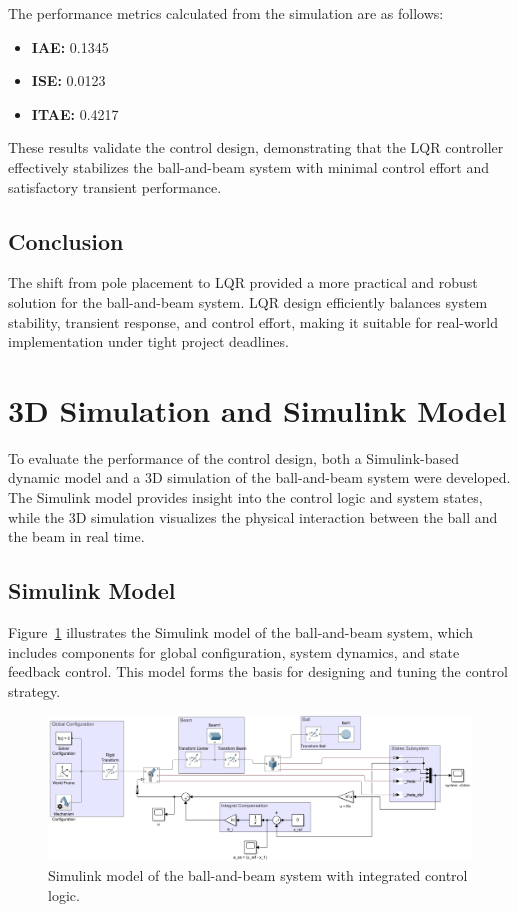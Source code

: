 \documentclass[conference]{IEEEtran}
\begin{document}
The performance metrics calculated from the simulation are as follows:
\begin{itemize}
    \item \textbf{IAE:} 0.1345
    \item \textbf{ISE:} 0.0123
    \item \textbf{ITAE:} 0.4217
\end{itemize}

These results validate the control design, demonstrating that the LQR controller effectively stabilizes the ball-and-beam system with minimal control effort and satisfactory transient performance.


\subsection{Conclusion}
\label{control_conclusion}
The shift from pole placement to LQR provided a more practical and robust solution for the ball-and-beam system. LQR design efficiently balances system stability, transient response, and control effort, making it suitable for real-world implementation under tight project deadlines.

\section{3D Simulation and Simulink Model}
\label{sec:simulation_model}

To evaluate the performance of the control design, both a Simulink-based dynamic model and a 3D simulation of the ball-and-beam system were developed. The Simulink model provides insight into the control logic and system states, while the 3D simulation visualizes the physical interaction between the ball and the beam in real time.

\subsection{Simulink Model}
\label{subsec:simulink_model}

Figure~\ref{fig:simulink_model} illustrates the Simulink model of the ball-and-beam system, which includes components for global configuration, system dynamics, and state feedback control. This model forms the basis for designing and tuning the control strategy.

\begin{figure}[h]
    \centering
    \includegraphics[width=\linewidth]{figures/simulink_model.png}
    \caption[]{Simulink model of the ball-and-beam system with integrated control logic.}
    \label{fig:simulink_model}
\end{figure}
\end{document}
